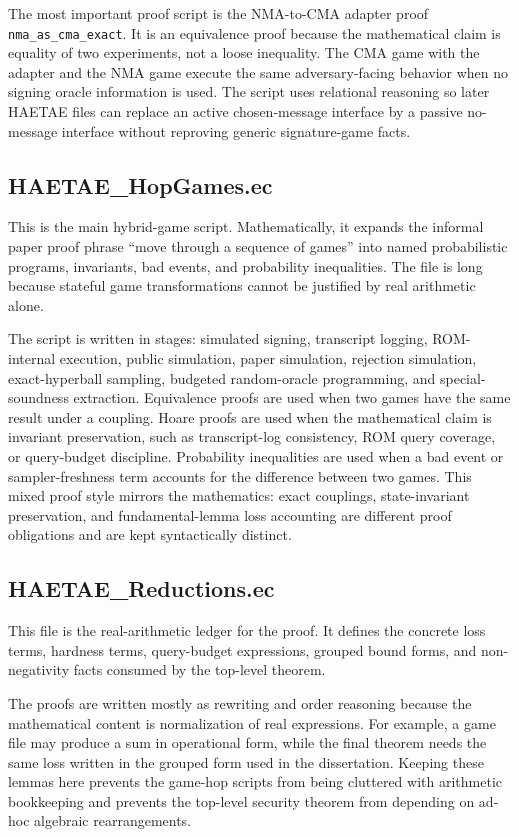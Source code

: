 \documentclass[11pt]{article}
\newcommand{\ec}[1]{\nolinkurl{#1}}
\begin{document}
The most important proof script is the NMA-to-CMA adapter proof
\ec{nma_as_cma_exact}.  It is an equivalence proof because the mathematical
claim is equality of two experiments, not a loose inequality.  The CMA game
with the adapter and the NMA game execute the same adversary-facing behavior
when no signing oracle information is used.  The script uses relational
reasoning so later HAETAE files can replace an active chosen-message interface
by a passive no-message interface without reproving generic signature-game
facts.

\subsection*{HAETAE\_HopGames.ec}

This is the main hybrid-game script.  Mathematically, it expands the informal
paper proof phrase ``move through a sequence of games'' into named
probabilistic programs, invariants, bad events, and probability inequalities.
The file is long because stateful game transformations cannot be justified by
real arithmetic alone.

The script is written in stages: simulated signing, transcript logging,
ROM-internal execution, public simulation, paper simulation, rejection
simulation, exact-hyperball sampling, budgeted random-oracle programming, and
special-soundness extraction.  Equivalence proofs are used when two games have
the same result under a coupling.  Hoare proofs are used when the mathematical
claim is invariant preservation, such as transcript-log consistency, ROM query
coverage, or query-budget discipline.  Probability inequalities are used when a
bad event or sampler-freshness term accounts for the difference between two
games.  This mixed proof style mirrors the mathematics: exact couplings,
state-invariant preservation, and fundamental-lemma loss accounting are
different proof obligations and are kept syntactically distinct.

\subsection*{HAETAE\_Reductions.ec}

This file is the real-arithmetic ledger for the proof.  It defines the concrete
loss terms, hardness terms, query-budget expressions, grouped bound forms, and
non-negativity facts consumed by the top-level theorem.

The proofs are written mostly as rewriting and order reasoning because the
mathematical content is normalization of real expressions.  For example, a game
file may produce a sum in operational form, while the final theorem needs the
same loss written in the grouped form used in the dissertation.  Keeping these
lemmas here prevents the game-hop scripts from being cluttered with arithmetic
bookkeeping and prevents the top-level security theorem from depending on
ad-hoc algebraic rearrangements.
\end{document}

